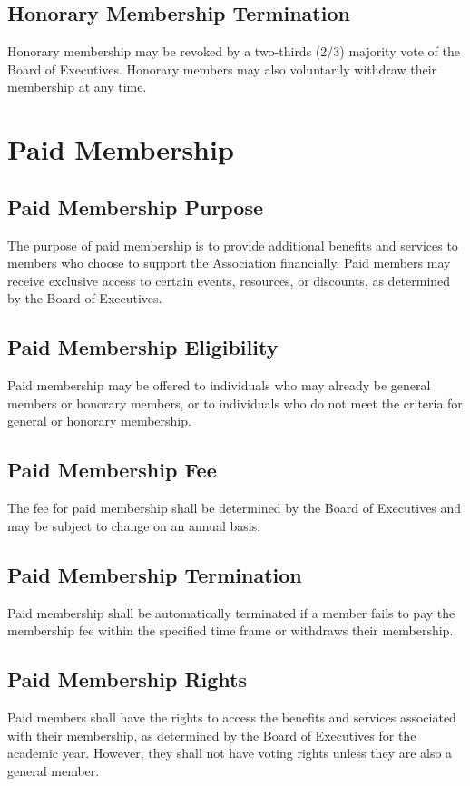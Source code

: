 \subsection{Honorary Membership Termination}
Honorary membership may be revoked by a two-thirds
(2/3) majority vote of the Board of Executives. Honorary members
may also voluntarily withdraw their membership at any time.

\section{Paid Membership}

\subsection{Paid Membership Purpose}
The purpose of paid membership is to provide additional
benefits and services to members who choose to support the Association
financially. Paid members may receive exclusive access to certain events,
resources, or discounts, as determined by the Board of
Executives.

\subsection{Paid Membership Eligibility}
Paid membership may be offered to individuals who may
already be general members or honorary members,
or to individuals who do not meet the criteria for general or honorary
membership.

\subsection{Paid Membership Fee}
The fee for paid membership shall be determined by the
Board of Executives and may be subject to change on an annual basis.

\subsection{Paid Membership Termination}
Paid membership shall be automatically terminated if a
member fails to pay the membership fee within the specified time frame
or withdraws their membership.

\subsection{Paid Membership Rights}
Paid members shall have the rights to access the benefits
and services associated with their membership, as determined by the
Board of Executives for the academic year.
However, they shall not have voting rights unless they are also
a general member.
